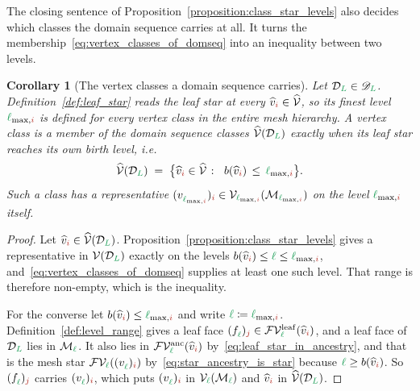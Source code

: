 \documentclass[a4paper, 12pt]{article}
\makeatletter
\newcommand{\lmaxIdx}[1]{\l_{\max,#1}}
\newcommand{\green}{\color{ForestGreen}}
\newcommand{\brickred}{\color{BrickRed}}
\newcommand{\V}{\mathcal{V}}
\newcommand{\F}{\mathcal{F}}
\newcommand{\vertex}[2]{\freeQ{v}{}{#1}{#2}}
\newcommand{\vertexClass}[1]{\widehat{v}_{#1}}
\newcommand{\vertexClasses}{\widehat{\V}}
\newcommand{\face}[2]{\freeQ{f}{}{#1}{#2}}
\newcommand{\FVl}[1]{\F\V_{#1}}
\newcommand{\coarseIdxone}{{\brickred i}}
\newcommand{\fineIdxone}{{\brickred j}}
\renewcommand{\l}{{\green\ell}}
\renewcommand{\L}{{\green L}}
\newcommand{\freeQ}[4]{ ( {#1}^{#2}_{#3} )_{#4}}
\newcommand{\M}{\mathcal{M}}
\newtheorem{corollary}[theorem]{Corollary}
\theoremstyle{definition}
\theoremstyle{plain}
\numberwithin{equation}{section}
\DeclareRobustCommand{\domseq}[1][]{\mathcal{D}\ifx\@empty#1\@empty\else_{#1}\fi}
\newcommand{\alldomseqs}{\mathscr{D}}
\newcommand{\birthLevel}{b}
\newcommand{\FVleaf}[1]{\F\V^{\mathrm{leaf}}_{#1}}          %
\newcommand{\FVanc}[1]{\F\V^{\mathrm{anc}}_{#1}}            %
\makeatother
\begin{document}
The closing sentence of Proposition~\ref{proposition:class_star_levels} also decides which classes the domain sequence carries at all. It turns the membership~\eqref{eq:vertex_classes_of_domseq} into an inequality between two levels.

\begin{corollary}[The vertex classes a domain sequence carries]
    \label{cor:birth_below_lmax}
    Let $\domseq[\L] \in \alldomseqs_\L$. Definition~\ref{def:leaf_star} reads the leaf star at every $\vertexClass{\coarseIdxone} \in \vertexClasses$, so its finest level $\lmaxIdx{\coarseIdxone}$ is defined for every vertex class in the entire mesh hierarchy. A vertex class is a member of the domain sequence classes $\vertexClasses(\domseq[\L])$ exactly when its leaf star reaches its own birth level, i.e.
    \begin{equation}
        \label{eq:birth_below_lmax}
        \vertexClasses(\domseq[\L]) \; = \; \big\{ \vertexClass{\coarseIdxone} \in \vertexClasses \; \colon \;\; \birthLevel(\vertexClass{\coarseIdxone}) \, \leq \, \lmaxIdx{\coarseIdxone} \big\} .
    \end{equation}
    Such a class has a representative $\vertex{\lmaxIdx{\coarseIdxone}}{\coarseIdxone} \in \V_{\lmaxIdx{\coarseIdxone}}(\M_{\lmaxIdx{\coarseIdxone}})$ on the level $\lmaxIdx{\coarseIdxone}$ itself.
\end{corollary}
\begin{proof}
    Let $\vertexClass{\coarseIdxone} \in \vertexClasses(\domseq[\L])$. Proposition~\ref{proposition:class_star_levels} gives a representative in $\V(\domseq[\L])$ exactly on the levels $\birthLevel(\vertexClass{\coarseIdxone}) \leq \l \leq \lmaxIdx{\coarseIdxone}$, and~\eqref{eq:vertex_classes_of_domseq} supplies at least one such level. That range is therefore non-empty, which is the inequality.

    For the converse let $\birthLevel(\vertexClass{\coarseIdxone}) \leq \lmaxIdx{\coarseIdxone}$ and write $\l \coloneq \lmaxIdx{\coarseIdxone}$. Definition~\ref{def:level_range} gives a leaf face $\face{\l}{\fineIdxone} \in \FVleaf{\l}(\vertexClass{\coarseIdxone})$, and a leaf face of $\domseq[\L]$ lies in $\M_\l$. It also lies in $\FVanc{\l}(\vertexClass{\coarseIdxone})$ by~\eqref{eq:leaf_star_in_ancestry}, and that is the mesh star $\FVl{\l}(\vertex{\l}{\coarseIdxone})$ by~\eqref{eq:star_ancestry_is_star} because $\l \geq \birthLevel(\vertexClass{\coarseIdxone})$. So $\face{\l}{\fineIdxone}$ carries $\vertex{\l}{\coarseIdxone}$, which puts $\vertex{\l}{\coarseIdxone}$ in $\V_\l(\M_\l)$ and $\vertexClass{\coarseIdxone}$ in $\vertexClasses(\domseq[\L])$.
\end{proof}
\end{document}
